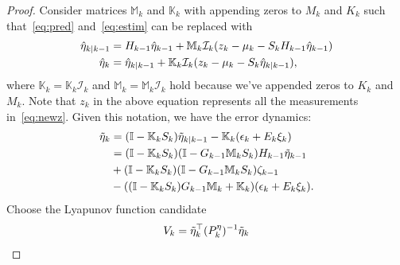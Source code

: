 \documentclass[letterpaper, 10 pt, conference]{ieeeconf}
\begin{document}
\begin{proof}
Consider matrices $\mathbb{M}_k$ and $\mathbb{K}_k$ with appending zeros to $M_k$ and $K_k$ such that~\eqref{eq:pred} and~\eqref{eq:estim} can be replaced with
\begin{align*}
    \hat{\eta}_{k|k-1} &= H_{k-1}\hat{\eta}_{k-1}+\mathbb{M}_k\mathcal{I}_k(z_k -\mu_{k} - S_{k}H_{k-1}\hat{\eta}_{k-1})\nonumber\\
    \hat{\eta}_k &= \hat{\eta}_{k|k-1} + \mathbb{K}_k\mathcal{I}_k (z_k - \mu_{k}-S_{k}\hat{\eta}_{k|k-1}),
\end{align*}
where $\mathbb{K}_k=\mathbb{K}_k \mathcal{I}_k$ and $\mathbb{M}_k=\mathbb{M}_k \mathcal{I}_k$ hold because we've appended zeros to $K_k$ and $M_k$. Note that $z_k$ in the above equation represents all the measurements in~\eqref{eq:newz}.
Given this notation, we have the error dynamics:
\begin{align*}
\tilde{\eta}_k &= (\mathbb{I}-\mathbb{K}_kS_k)\tilde{\eta}_{k|k-1}-\mathbb{K}_k(\epsilon_k+E_k\xi_k)\nonumber\\
&=(\mathbb{I}-\mathbb{K}_kS_k)(\mathbb{I}-G_{k-1} \mathbb{M}_kS_k)H_{k-1}\tilde{\eta}_{k-1}\nonumber\\
&+(\mathbb{I}-\mathbb{K}_kS_k)(\mathbb{I}-G_{k-1} \mathbb{M}_kS_k)\zeta_{k-1}\nonumber\\
&-((\mathbb{I}-\mathbb{K}_kS_k)G_{k-1} \mathbb{M}_k+\mathbb{K}_k)(\epsilon_k+E_k\xi_k).
\end{align*}
Choose the Lyapunov function candidate
\begin{align}
    &V_k = \tilde{\eta}_k^\top(P_k^{\eta})^{-1}\tilde{\eta}_k\nnum\\

\end{align}
\end{proof}
\end{document}
